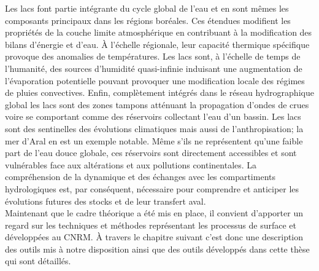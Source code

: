 Les lacs font partie intégrante du cycle global de l'eau et en sont mêmes les composants principaux dans les régions boréales. Ces étendues modifient les propriétés de la couche limite atmosphérique en contribuant à la modification des bilans d'énergie et d'eau. À l'échelle régionale, leur capacité thermique spécifique provoque des anomalies de températures. Les lacs sont, à l'échelle de temps de l'humanité, des sources d'humidité quasi-infinie induisant une augmentation de l'évaporation potentielle pouvant provoquer une modification locale des régimes de pluies convectives. Enfin, complètement intégrés dans le réseau hydrographique global les lacs sont des zones tampons atténuant la propagation d'ondes de crues voire se comportant comme des réservoirs collectant l'eau d'un bassin. Les lacs sont des sentinelles des évolutions climatiques mais aussi de l'anthropisation; la mer d'Aral en est un exemple notable. Même s'ils ne représentent qu'une faible part de l'eau douce globale, ces réservoirs sont directement accessibles et sont vulnérables face aux altérations et aux pollutions continentales. 
La compréhension de la dynamique et des échanges avec les compartiments hydrologiques est, par conséquent, nécessaire pour comprendre et anticiper les évolutions futures des stocks et de leur transfert aval.\\

\noindent Maintenant que le cadre théorique a été mis en place, il convient d'apporter un regard sur les techniques et méthodes représentant les processus de surface et développées au CNRM. À travers le chapitre suivant c'est donc une description des outils mis à notre disposition ainsi que des outils développés dans cette thèse qui sont détaillés.

